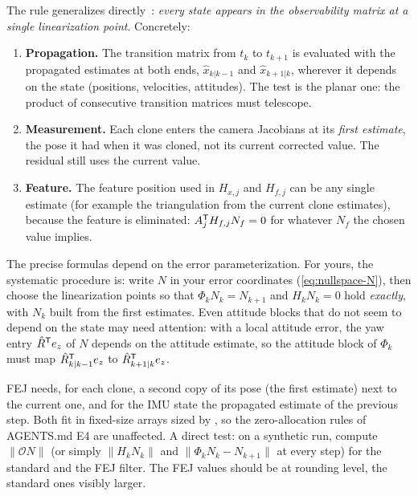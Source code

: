 The rule generalizes directly~\cite{li2013msckf2}: \emph{every state appears in the observability matrix at a single linearization point}. Concretely:
\begin{enumerate}
  \item \textbf{Propagation.} The transition matrix from $t_k$ to $t_{k+1}$ is evaluated with the propagated estimates at both ends,
        $\hat x_{k|k-1}$ and $\hat x_{k+1|k}$, wherever it depends on the state (positions, velocities, attitudes). The test is the planar one: the product of
        consecutive transition matrices must telescope.
  \item \textbf{Measurement.} Each clone enters the camera Jacobians at its \emph{first estimate}, the pose it had when it was cloned, not its
        current corrected value. The residual still uses the current value.
  \item \textbf{Feature.} The feature position used in $H_{x,j}$ and $H_{f,j}$ can be any single estimate (for example the triangulation from the
        current clone estimates), because the feature is eliminated: $A_j^{\mathsf{T}} H_{f,j}N_f = 0$ for whatever $N_f$ the chosen value implies.
\end{enumerate}
The precise formulas depend on the error parameterization. For yours, the systematic procedure is: write $N$ in your error coordinates
(\eqref{eq:nullspace-N}), then choose the linearization points so that $\Phi_kN_k = N_{k+1}$ and $H_kN_k = 0$ hold \emph{exactly}, with $N_k$ built from the
first estimates. Even attitude blocks that do not seem to depend on the state may need attention: with a local attitude error, the yaw entry
$\hat R^{\mathsf{T}} e_z$ of $N$ depends on the attitude estimate, so the attitude block of $\Phi_k$ must map $\hat R_{k|k-1}^{\mathsf{T}} e_z$ to $\hat R_{k+1|k}^{\mathsf{T}} e_z$.

\begin{implnote}
FEJ needs, for each clone, a second copy of its pose (the first estimate) next to the current one, and for the IMU state the propagated
estimate of the previous step. Both fit in fixed-size arrays sized by , so the zero-allocation rules of AGENTS.md E4 are
unaffected. A direct test: on a synthetic run, compute $\|\mathcal{O}N\|$ (or simply $\|H_kN_k\|$ and $\|\Phi_kN_k - N_{k+1}\|$ at every step) for the
standard and the FEJ filter. The FEJ values should be at rounding level, the standard ones visibly larger.
\end{implnote}

